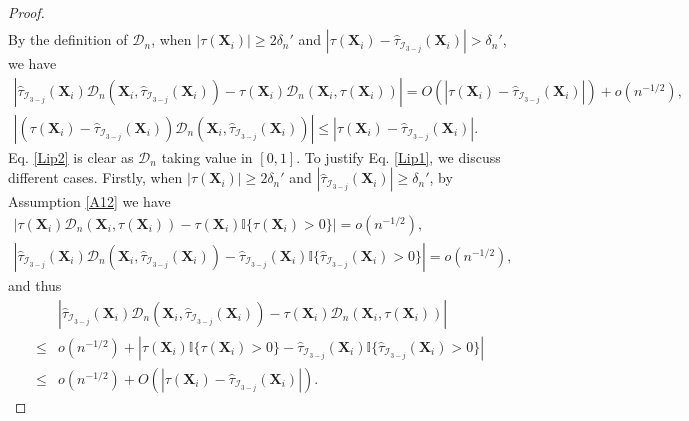 \documentclass[11pt]{article}
\theoremstyle{referenceplain}
\theoremstyle{referencedefinition}
\theoremstyle{referenceremark}
\begin{document}
\begin{proof}
\begin{align*}
    \end{align*}
By the definition of $\mathcal{D}_n$, when $|\tau(\mathbf{X}_i)|\ge2\delta_n'$ and $|\tau(\mathbf{X}_i)-\widehat{\tau}_{\mathcal{I}_{3-j}}(\mathbf{X}_i)|>\delta_n'$, we have
\begin{align}
    \left|\widehat{\tau}_{\mathcal{I}_{3-j}}(\mathbf{X}_i)\mathcal{D}_n(\mathbf{X}_i,\widehat{\tau}_{\mathcal{I}_{3-j}}(\mathbf{X}_i)) -\tau(\mathbf{X}_i)\mathcal{D}_n(\mathbf{X}_i,\tau(\mathbf{X}_i))\right|= O\left(|\tau(\mathbf{X}_i)-\widehat{\tau}_{\mathcal{I}_{3-j}}(\mathbf{X}_i)|\right)+o(n^{-1/2}),\label{Lip1}\\
    \left|(\tau(\mathbf{X}_i)-\widehat{\tau}_{\mathcal{I}_{3-j}}(\mathbf{X}_i))\mathcal{D}_n(\mathbf{X}_i,\widehat{\tau}_{\mathcal{I}_{3-j}}(\mathbf{X}_i))\right|\leq  |\tau(\mathbf{X}_i)-\widehat{\tau}_{\mathcal{I}_{3-j}}(\mathbf{X}_i)|.\label{Lip2}
\end{align}
Eq. \eqref{Lip2} is clear as $\mathcal{D}_n$ taking value in $[0,1]$. To justify Eq. \eqref{Lip1}, we discuss different cases. Firstly, when $|\tau(\mathbf{X}_i)|\ge 2\delta_n'$ and $|\widehat{\tau}_{\mathcal{I}_{3-j}}(\mathbf{X}_i)|\ge \delta_n'$, by Assumption \ref{A12} we have
\begin{align*}
    \left|\tau(\mathbf{X}_i)\mathcal{D}_n(\mathbf{X}_i,\tau(\mathbf{X}_i)) - \tau(\mathbf{X}_i)\mathbb{I}\{\tau(\mathbf{X}_i)>0\}\right|=o(n^{-1/2}),\\
    \left|\widehat{\tau}_{\mathcal{I}_{3-j}}(\mathbf{X}_i)\mathcal{D}_n(\mathbf{X}_i,\widehat{\tau}_{\mathcal{I}_{3-j}}(\mathbf{X}_i)) - \widehat{\tau}_{\mathcal{I}_{3-j}}(\mathbf{X}_i)\mathbb{I}\{\widehat{\tau}_{\mathcal{I}_{3-j}}(\mathbf{X}_i)>0\}\right|=o(n^{-1/2}),
\end{align*}
and thus
\begin{align*}
     &\left|\widehat{\tau}_{\mathcal{I}_{3-j}}(\mathbf{X}_i)\mathcal{D}_n(\mathbf{X}_i,\widehat{\tau}_{\mathcal{I}_{3-j}}(\mathbf{X}_i)) -\tau(\mathbf{X}_i)\mathcal{D}_n(\mathbf{X}_i,\tau(\mathbf{X}_i))\right|\\
     \leq&o(n^{-1/2})+\left|\tau(\mathbf{X}_i)\mathbb{I}\{\tau(\mathbf{X}_i)>0\} - \widehat{\tau}_{\mathcal{I}_{3-j}}(\mathbf{X}_i)\mathbb{I}\{\widehat{\tau}_{\mathcal{I}_{3-j}}(\mathbf{X}_i)>0\}\right|\\
     \leq&o(n^{-1/2})+O(|\tau(\mathbf{X}_i)-\widehat{\tau}_{\mathcal{I}_{3-j}}(\mathbf{X}_i)|).
\end{align*}

\end{proof}
\end{document}
